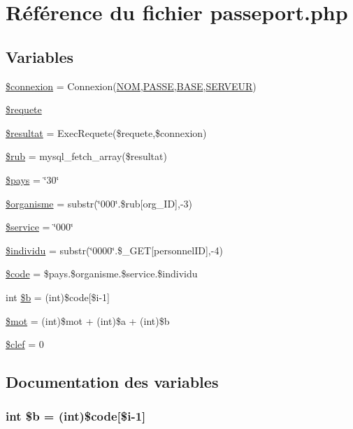 \hypertarget{passeport_8php}{
\section{R\'{e}f\'{e}rence du fichier passeport.php}
\label{passeport_8php}
}
\subsection*{Variables}
\begin{CompactItemize}
\item 
\hyperlink{passeport_8php_a0}{\$connexion} = Connexion(\hyperlink{pma__connect_8php_a0}{NOM},\hyperlink{pma__connect_8php_a1}{PASSE},\hyperlink{pma__connect_8php_a3}{BASE},\hyperlink{pma__connect_8php_a2}{SERVEUR})
\item 
\hyperlink{passeport_8php_a1}{\$requete}
\item 
\hyperlink{passeport_8php_a2}{\$resultat} = Exec\-Requete(\$requete,\$connexion)
\item 
\hyperlink{passeport_8php_a3}{\$rub} = mysql\_\-fetch\_\-array(\$resultat)
\item 
\hyperlink{passeport_8php_a4}{\$pays} = \char`\"{}30\char`\"{}
\item 
\hyperlink{passeport_8php_a5}{\$organisme} = substr(\char`\"{}000\char`\"{}.\$rub\mbox{[}org\_\-ID\mbox{]},-3)
\item 
\hyperlink{passeport_8php_a6}{\$service} = \char`\"{}000\char`\"{}
\item 
\hyperlink{passeport_8php_a7}{\$individu} = substr(\char`\"{}0000\char`\"{}.\$\_\-GET\mbox{[}personnel\-ID\mbox{]},-4)
\item 
\hyperlink{passeport_8php_a8}{\$code} = \$pays.\$organisme.\$service.\$individu
\item 
int \hyperlink{passeport_8php_a9}{\$b} = (int)\$code\mbox{[}\$i-1\mbox{]}
\item 
\hyperlink{passeport_8php_a10}{\$mot} = (int)\$mot + (int)\$a + (int)\$b
\item 
\hyperlink{passeport_8php_a11}{\$clef} = 0
\end{CompactItemize}


\subsection{Documentation des variables}
\hypertarget{passeport_8php_a9}{
\subsubsection[\$b]{\setlength{\rightskip}{0pt plus 5cm}int \$b = (int)\$code\mbox{[}\$i-1\mbox{]}}}
\label{passeport_8php_a9}



